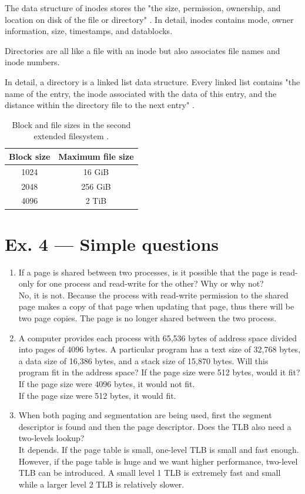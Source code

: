 \documentclass[a4paper]{article}
\begin{document}
The data structure of inodes stores the "the size, permission, ownership, and location on disk of the file or directory" \cite{ext2wiki}. In detail, inodes contains mode, owner information, size, timestamps, and datablocks.

Directories are all like a file with an inode but also associates file names and inode numbers.

In detail, a directory is a linked list data structure. Every linked list contains "the name of the entry, the inode associated with the data of this entry, and the distance within the directory file to the next entry" \cite{nongnu}.
\begin{table}[H]
    \centering
    \begin{tabular}{|c|c|}
        \hline
        Block size&Maximum file size\\
        \hline
        1024&16 GiB\\
        \hline
        2048&256 GiB\\
        \hline
        4096&2 TiB\\
        \hline
    \end{tabular}
    \caption{Block and file sizes in the second extended filesystem \cite{proflinuxk}.}
\end{table}
\section*{Ex. 4 — Simple questions}
\begin{enumerate}
    \item If a page is shared between two processes, is it possible that the page is read-only for one process and read-write for the other? Why or why not?\\
    ‌No, it is not. Because the process with read-write permission to the shared page makes a copy of that page when updating that page, thus there will be two page copies. The page is no longer shared between the two process.
    \item A computer provides each process with 65,536 bytes of address space divided into pages of 4096 bytes. A particular program has a text size of 32,768 bytes, a data size of 16,386 bytes, and a stack size of 15,870 bytes. Will this program fit in the address space? If the page size were 512 bytes, would it fit?\\
    If the page size were 4096 bytes, it would not fit.\\
    If the page size were 512 bytes, it would fit.
    \item When both paging and segmentation are being used, first the segment descriptor is found and then the page descriptor. Does the TLB also need a two-levels lookup?\\
    It depends. If the page table is small, one-level TLB is small and fast enough. However, if the page table is huge and we want higher performance, two-level TLB can be introduced. A small level 1 TLB is extremely fast and small while a larger level 2 TLB is relatively slower.
\end{enumerate}
\printbibliography
\end{document}

